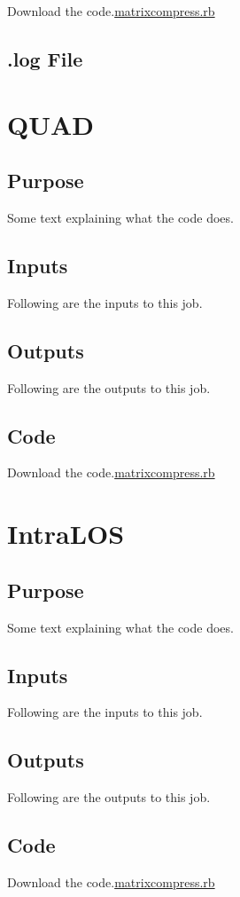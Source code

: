 \documentclass[
  letterpaper,
  DIV=11,
  numbers=noendperiod]{scrreprt}
\begin{document}
Download the code.\href{../../first.rb}{matrixcompress.rb}

\subsection{.log File}

\section{QUAD}\label{quad}

\subsection{Purpose}

Some text explaining what the code does.

\subsection{Inputs}

Following are the inputs to this job.

\subsection{Outputs}

Following are the outputs to this job.

\subsection{Code}

Download the code.\href{../first.rb}{matrixcompress.rb}

\section{IntraLOS}\label{intralos}

\subsection{Purpose}

Some text explaining what the code does.

\subsection{Inputs}

Following are the inputs to this job.

\subsection{Outputs}

Following are the outputs to this job.

\subsection{Code}

Download the code.\href{../first.rb}{matrixcompress.rb}
\end{document}

